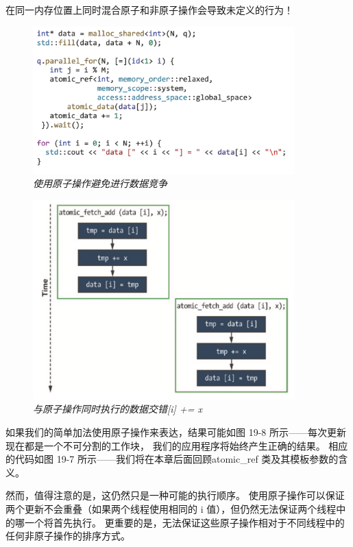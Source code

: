 \begin{remark}
	在同一内存位置上同时混合原子和非原子操作会导致未定义的行为！
\end{remark}

\begin{figure}[H]
	\centering
	\includegraphics[width=0.9\textwidth]{figs/F19.7.png}
	\caption{\textit{使用原子操作避免进行数据竞争 }}
\end{figure}

\begin{figure}[H]
	\centering
	\includegraphics[width=0.9\textwidth]{figs/F19.8.png}
	\caption{\textit{与原子操作同时执行的数据交错[i] += x }}
\end{figure}

如果我们的简单加法使用原子操作来表达，结果可能如图 19-8 所示——每次更新现在都是一个不可分割的工作块，
我们的应用程序将始终产生正确的结果。 
相应的代码如图 19-7 所示——我们将在本章后面回顾atomic\_ref 类及其模板参数的含义。

然而，值得注意的是，这仍然只是一种可能的执行顺序。 
使用原子操作可以保证两个更新不会重叠（如果两个线程使用相同的 i 值），但仍然无法保证两个线程中的哪一个将首先执行。 
更重要的是，无法保证这些原子操作相对于不同线程中的任何非原子操作的排序方式。

